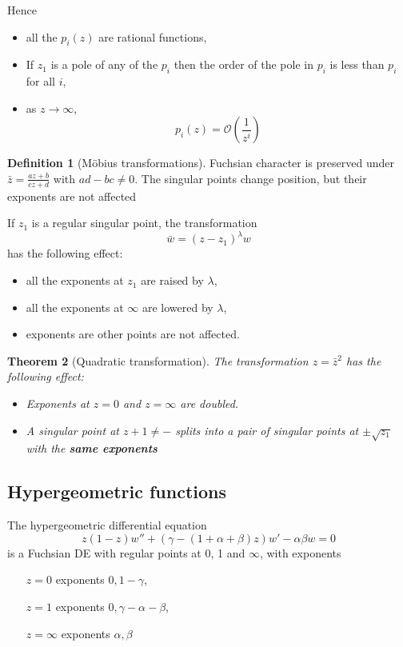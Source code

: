 \documentclass[10pt, oneside, reqno]{amsart}
\theoremstyle{plain}%
\newtheorem{thm}{Theorem}[section]
\theoremstyle{definition}
\newtheorem{defn}[thm]{Definition}
\theoremstyle{remark}
\newcommand{\bigo}[1]{\mathcal{O}(#1)}
\begin{document}
Hence \begin{itemize}
	\item all the $p_i(z)$ are rational functions,
	\item If $z_1$ is a pole of any of the $p_i$ then the order of the pole in $p_i$ is less than $p_i$ for all $i$,
	\item as $z \rightarrow \infty$, \[
		p_i(z) = \bigo{\frac{1}{z^i}}
	\]
\end{itemize}

\begin{defn}[M\"obius transformations]
	Fuchsian character is preserved under $\bar z = \frac{az + b}{cz + d}$ with $ad - bc \neq 0$.  The singular points change position, but their exponents are not affected
\end{defn}

If $z_1$ is a regular singular point, the transformation \[
	\bar w = (z - z_1)^\lambda w
\] has the following effect: 
\begin{itemize}
	\item all the exponents at $z_1$ are raised by $\lambda$,
	\item all the exponents at $\infty$ are lowered by $\lambda$,
	\item exponents are other points are not affected.
\end{itemize}

\begin{thm}[Quadratic transformation]
	The transformation $z = \bar z ^2$ has the following effect:
	\begin{itemize}
		\item Exponents at $z = 0$ and $z = \infty$ are doubled.
		\item A singular point at $z+1 \neq -$ splits into a pair of singular points at $\pm \sqrt{z_1}$ with the \textbf{same exponents}
	\end{itemize}
\end{thm}



\subsection{Hypergeometric functions} %
\label{sec:hypergeometric_functions}
The hypergeometric differential equation \[
	z(1-z) w'' + (\gamma - (1 + \alpha + \beta)z)w' - \alpha \beta w = 0
\] is a Fuchsian DE with regular points at 0, 1 and $\infty$, with exponents
\begin{itemize}
	\item[$z = 0$] exponents $0, 1 - \gamma$,
	\item[$z = 1$] exponents $0, \gamma - \alpha - \beta$,
	\item[$z = \infty$] exponents $\alpha, \beta$
\end{itemize}
\end{document}

